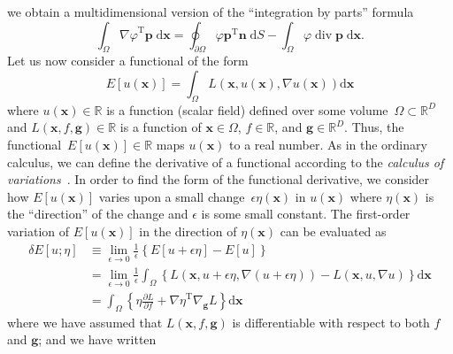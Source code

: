 \documentclass[12pt,a4paper]{article}
\begin{document}
we obtain a multidimensional version of the ``integration by parts'' formula
\begin{equation}
\int_{\Omega} {\nabla\varphi}^{\operatorname{T}} \mathbf{p} \; \mathrm{d}\mathbf{x} =
\oint_{\partial\Omega} \varphi\mathbf{p}^{\operatorname{T}} \mathbf{n} \; \mathrm{d}S -
\int_{\Omega} \varphi \operatorname{div}\mathbf{p} \; \mathrm{d}\mathbf{x} .
\label{eq:multidimensional_integration_by_parts}
\end{equation}
Let us now consider a functional of the form
\begin{equation}
E\left[u(\mathbf{x})\right] =
\int_{\Omega} L\left(\mathbf{x}, u(\mathbf{x}), \nabla u(\mathbf{x})\right) \mathrm{d}\mathbf{x}
\end{equation}
where $u(\mathbf{x}) \in \mathbb{R}$ is a function (scalar field) defined over
some volume~$\Omega \subset \mathbb{R}^{D}$ and
$L(\mathbf{x}, f, \mathbf{g}) \in \mathbb{R}$ is a function of
$\mathbf{x} \in \Omega$, $f \in \mathbb{R}$, and $\mathbf{g} \in \mathbb{R}^{D}$.
Thus, the functional~$E\left[u(\mathbf{x})\right] \in \mathbb{R}$ maps $u(\mathbf{x})$ to
a real number.
As in the ordinary calculus, we can define the derivative of a functional according to
the \emph{calculus of variations}~\citep{Feynman:FeynmanLectures2,Bishop:PRML}.
In order to find the form of the functional derivative,
we consider how $E\left[u(\mathbf{x})\right]$ varies upon
a small change~$\epsilon\eta(\mathbf{x})$ in $u(\mathbf{x})$
where $\eta(\mathbf{x})$ is the ``direction'' of the change and
$\epsilon$ is some small constant.
The first-order variation of $E\left[u(\mathbf{x})\right]$ in the direction of $\eta(\mathbf{x})$
can be evaluated as
\begin{align}
\delta E[u; \eta] &\equiv
\lim_{\epsilon \to 0} \frac{1}{\epsilon} \left\{ E[u + \epsilon\eta] - E[u] \right\}
\label{eq:first_order_variation_of_E_in_eta} \\
&= \lim_{\epsilon \to 0} \frac{1}{\epsilon}
\int_{\Omega} \left\{
L\left(\mathbf{x}, u + \epsilon\eta, \nabla (u + \epsilon\eta)\right) -
L\left(\mathbf{x}, u, \nabla u\right)
\right\} \mathrm{d}\mathbf{x} \\
&= \int_{\Omega} \left\{
\eta\frac{\partial L}{\partial f} +
{\nabla\eta}^{\operatorname{T}} \nabla_{\mathbf{g}} L
\right\} \mathrm{d}\mathbf{x}
\label{eq:first_order_variation_of_E_wrt_u_in_eta_before_expansion}
\end{align}
where we have assumed that $L(\mathbf{x}, f, \mathbf{g})$ is differentiable with respect to
both $f$ and $\mathbf{g}$; and we have written
\end{document}
